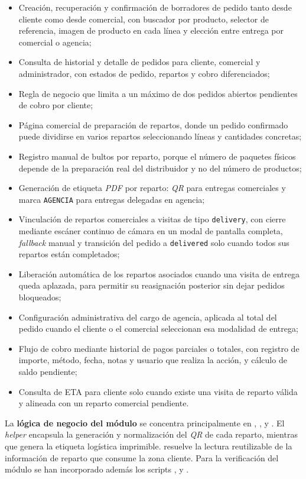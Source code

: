 \begin{itemize}
    \item Creación, recuperación y confirmación de borradores de pedido tanto desde cliente como desde comercial, con buscador por producto, selector de referencia, imagen de producto en cada línea y elección entre entrega por comercial o agencia;
    \item Consulta de historial y detalle de pedidos para cliente, comercial y administrador, con estados de pedido, repartos y cobro diferenciados;
    \item Regla de negocio que limita a un máximo de dos pedidos abiertos pendientes de cobro por cliente;
    \item Página comercial de preparación de repartos, donde un pedido confirmado puede dividirse en varios repartos seleccionando líneas y cantidades concretas;
    \item Registro manual de bultos por reparto, porque el número de paquetes físicos depende de la preparación real del distribuidor y no del número de productos;
    \item Generación de etiqueta \textit{PDF} por reparto: \textit{QR} para entregas comerciales y marca \texttt{AGENCIA} para entregas delegadas en agencia;
    \item Vinculación de repartos comerciales a visitas de tipo \texttt{delivery}, con cierre mediante escáner continuo de cámara en un modal de pantalla completa, \textit{fallback} manual y transición del pedido a \texttt{delivered} solo cuando todos sus repartos están completados;
    \item Liberación automática de los repartos asociados cuando una visita de entrega queda aplazada, para permitir su reasignación posterior sin dejar pedidos bloqueados;
    \item Configuración administrativa del cargo de agencia, aplicada al total del pedido cuando el cliente o el comercial seleccionan esa modalidad de entrega;
    \item Flujo de cobro mediante historial de pagos parciales o totales, con registro de importe, método, fecha, notas y usuario que realiza la acción, y cálculo de saldo pendiente;
    \item Consulta de ETA para cliente solo cuando existe una visita de reparto válida y alineada con un reparto comercial pendiente.
\end{itemize}

La \textbf{lógica de negocio del módulo} se concentra principalmente en , ,  y . El \textit{helper}  encapsula la generación y normalización del \textit{QR} de cada reparto, mientras que  genera la etiqueta logística imprimible.  resuelve la lectura reutilizable de la información de reparto que consume la zona cliente. Para la verificación del módulo se han incorporado además los scripts ,  y .

